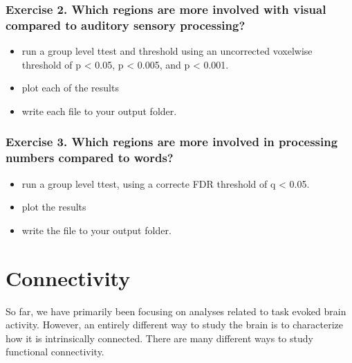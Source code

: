 \documentclass[letterpaper,10pt,english]{sphinxmanual}
\begin{document}
\subsubsection{Exercise 2. Which regions are more involved with visual compared to auditory sensory processing?}
\label{\detokenize{content/Thresholding_Group_Analyses:exercise-2-which-regions-are-more-involved-with-visual-compared-to-auditory-sensory-processing}}\begin{itemize}
\item {} 
run a group level t\sphinxhyphen{}test and threshold using an uncorrected voxel\sphinxhyphen{}wise threshold of p \textless{} 0.05, p \textless{} 0.005, and p \textless{} 0.001.

\item {} 
plot each of the results

\item {} 
write each file to your output folder.

\end{itemize}


\subsubsection{Exercise 3. Which regions are more involved in processing numbers compared to words?}
\label{\detokenize{content/Thresholding_Group_Analyses:exercise-3-which-regions-are-more-involved-in-processing-numbers-compared-to-words}}\begin{itemize}
\item {} 
run a group level t\sphinxhyphen{}test, using a correcte FDR threshold of q \textless{} 0.05.

\item {} 
plot the results

\item {} 
write the file to your output folder.

\end{itemize}


\section{Connectivity}
\label{\detokenize{content/Connectivity:connectivity}}\label{\detokenize{content/Connectivity::doc}}

So far, we have primarily been focusing on analyses related to task evoked brain activity. However, an entirely different way to study the brain is to characterize how it is intrinsically connected. There are many different ways to study functional connectivity.
\end{document}
